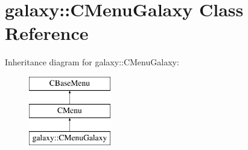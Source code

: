 \hypertarget{classgalaxy_1_1_c_menu_galaxy}{
\section{galaxy::CMenuGalaxy Class Reference}
\label{classgalaxy_1_1_c_menu_galaxy}
}
Inheritance diagram for galaxy::CMenuGalaxy:\begin{figure}[H]
\begin{center}
\leavevmode
\includegraphics[height=3cm]{classgalaxy_1_1_c_menu_galaxy}
\end{center}
\end{figure}
